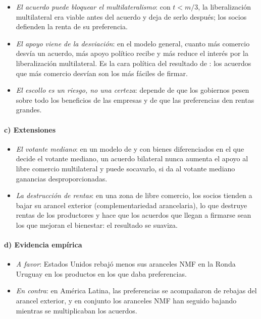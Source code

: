 \documentclass[11pt]{article}
\begin{document}
\begin{itemize}
\item \emph{El acuerdo puede bloquear el multilateralismo}: con $t<m/3$, la liberalización multilateral era viable antes del acuerdo y deja de serlo después; los socios defienden la renta de su preferencia.
\item \emph{El apoyo viene de la desviación}: en el modelo general, cuanto más comercio desvía un acuerdo, más apoyo político recibe y más reduce el interés por la liberalización multilateral\nocite{Krishna1998}. Es la cara política del resultado de : los acuerdos que más comercio desvían son los más fáciles de firmar\nocite{GrossmanHelpman1995Politics}.
\item \emph{El escollo es un riesgo, no una certeza}: depende de que los gobiernos pesen sobre todo los beneficios de las empresas y de que las preferencias den rentas grandes.
\end{itemize}

\paragraph{c) Extensiones}

\begin{itemize}
\item \emph{El votante mediano}: en un modelo de  y  con bienes diferenciados en el que decide el votante mediano, un acuerdo bilateral nunca aumenta el apoyo al libre comercio multilateral y puede socavarlo, si da al votante mediano ganancias desproporcionadas\nocite{Levy1997}.
\item \emph{La destrucción de rentas}: en una zona de libre comercio, los socios tienden a bajar su arancel exterior (complementariedad arancelaria), lo que destruye rentas de los productores y hace que los acuerdos que llegan a firmarse sean los que mejoran el bienestar\nocite{Ornelas2005Rent}: el resultado se suaviza.
\end{itemize}

\paragraph{d) Evidencia empírica}

\begin{itemize}
\item \emph{A favor}: Estados Unidos rebajó menos sus aranceles NMF en la Ronda Uruguay en los productos en los que daba preferencias\nocite{Limao2006}.
\item \emph{En contra}: en América Latina, las preferencias se acompañaron de rebajas del arancel exterior\nocite{EstevadeordalFreundOrnelas2008}, y en conjunto los aranceles NMF han seguido bajando mientras se multiplicaban los acuerdos\nocite{FreundOrnelas2010}.
\end{itemize}
\end{document}
